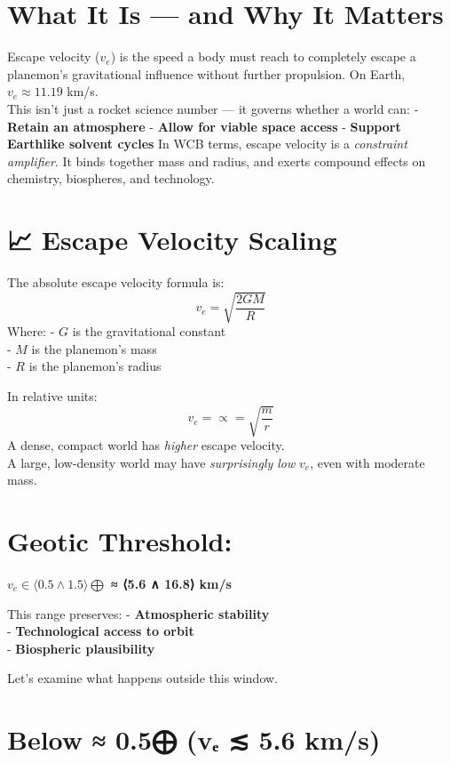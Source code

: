 \documentclass[
  letterpaper,
]{book}
\begin{document}
\section{What It Is --- and Why It
Matters}\label{what-it-is-and-why-it-matters}

Escape velocity (\(v_e\)) is the speed a body must reach to completely
escape a planemon's gravitational influence without further propulsion.
On Earth, \(v_e ≈ 11.19\) km/s.\\
This isn't just a rocket science number --- it governs whether a world
can: - \textbf{Retain an atmosphere} - \textbf{Allow for viable space
access} - \textbf{Support Earthlike solvent cycles} In WCB terms, escape
velocity is a \emph{constraint amplifier}. It binds together mass and
radius, and exerts compound effects on chemistry, biospheres, and
technology.

\section{📈 Escape Velocity Scaling}\label{escape-velocity-scaling}

The absolute escape velocity formula is: \[
v_e = \sqrt{\frac{2GM}{R}}
\]Where: - \(G\) is the gravitational constant\\
- \(M\) is the planemon's mass\\
- \(R\) is the planemon's radius

In relative units: \[
v_e =\propto= \sqrt{\frac{m}{r}}
\] A dense, compact world has \emph{higher} escape velocity.\\
A large, low-density world may have \emph{surprisingly low} \(v_e\),
even with moderate mass.

\section{Geotic Threshold:}\label{geotic-threshold}

\textbf{\(v_e ∈ \langle0.5 \wedge 1.5\rangle⨁\) ≈ ⟨5.6 ∧ 16.8⟩ km/s}

This range preserves: - \textbf{Atmospheric stability}\\
- \textbf{Technological access to orbit}\\
- \textbf{Biospheric plausibility}

Let's examine what happens outside this window.

\section{Below ≈ 0.5⨁ (vₑ ≲ 5.6 km/s)}\label{below-0.5-vux2091-5.6-kms}
\end{document}
